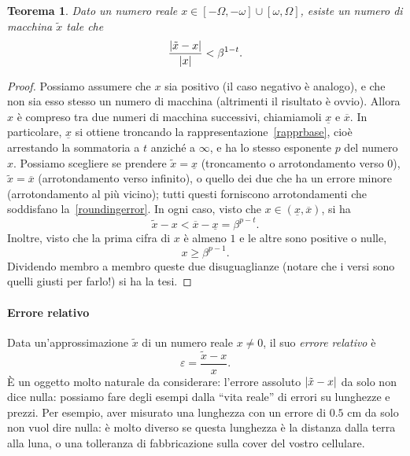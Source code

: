 \documentclass[a4paper]{report}
\DeclarePairedDelimiter{\abs}{\lvert}{\rvert}
\newtheorem{theorem}{Teorema}[chapter]
\theoremstyle{definiton}
\theoremstyle{remark}
\begin{document}
\begin{theorem} Dato un numero reale $x \in [-\Omega, -\omega] \cup [\omega, \Omega]$, esiste un numero di macchina $\tilde{x}$ tale che
\begin{equation} \label{roundingerror}
    \frac{\abs{\tilde{x}-x}}{\abs{x}} < \beta^{1-t}.    
\end{equation}
\end{theorem}
\begin{proof}
Possiamo assumere che $x$ sia positivo (il caso negativo è analogo), e che non sia esso stesso un numero di macchina (altrimenti il risultato è ovvio). Allora $x$ è compreso tra due numeri di macchina successivi, chiamiamoli $\underline{x}$ e $\overline{x}$. In particolare, $\underline{x}$ si ottiene troncando la rappresentazione~\eqref{rapprbase}, cioè arrestando la sommatoria a $t$ anziché a $\infty$, e ha lo stesso esponente $p$ del numero $x$. Possiamo scegliere se prendere $\tilde{x} = \underline{x}$ (troncamento o arrotondamento verso $0$), $\tilde{x} = \overline{x}$ (arrotondamento verso infinito), o quello dei due che ha un errore minore (arrotondamento al più vicino); tutti questi forniscono arrotondamenti che soddisfano la~\eqref{roundingerror}. In ogni caso, visto che $x \in (\underline{x}, \overline{x})$, si ha 
\begin{equation}
    \tilde{x}-x < \overline{x} - \underline{x} = \beta^{p-t}.
\end{equation}
Inoltre, visto che la prima cifra di $x$ è almeno $1$ e le altre sono positive o nulle,
\begin{equation}
    x \geq \beta^{p-1}.
\end{equation}
Dividendo membro a membro queste due disuguaglianze (notare che i versi sono quelli giusti per farlo!) si ha la tesi.
\end{proof}

\paragraph{Errore relativo}
Data un'approssimazione $\tilde{x}$ di un numero reale $x \neq 0$, il suo \emph{errore relativo} è
\begin{equation} \label{relerr}
    \varepsilon = \frac{\tilde{x}-x}{x}.    
\end{equation}
È un oggetto molto naturale da considerare: l'errore assoluto $\abs{\tilde{x}-x}$ da solo non dice nulla: possiamo fare degli esempi dalla ``vita reale'' di errori su lunghezze e prezzi. Per esempio, aver misurato una lunghezza con un errore di $0.5 \text{ cm}$ da solo non vuol dire nulla: è molto diverso se questa lunghezza è la distanza dalla terra alla luna, o una tolleranza di fabbricazione sulla cover del vostro cellulare.
\end{document}

